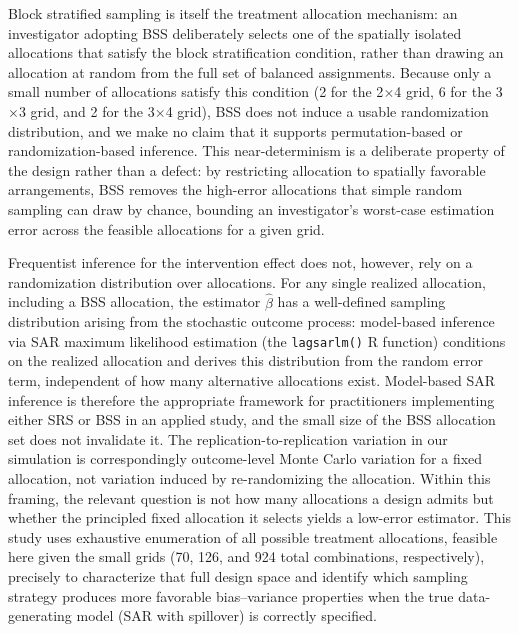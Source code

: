 \documentclass{article}[11pt]
\begin{document}
Block stratified sampling is itself the treatment allocation mechanism: an investigator adopting BSS deliberately selects one of the spatially isolated allocations that satisfy the block stratification condition, rather than drawing an allocation at random from the full set of balanced assignments. Because only a small number of allocations satisfy this condition (2 for the 2$\times$4 grid, 6 for the 3$\times$3 grid, and 2 for the 3$\times$4 grid), BSS does not induce a usable randomization distribution, and we make no claim that it supports permutation-based or randomization-based inference. This near-determinism is a deliberate property of the design rather than a defect: by restricting allocation to spatially favorable arrangements, BSS removes the high-error allocations that simple random sampling can draw by chance, bounding an investigator's worst-case estimation error across the feasible allocations for a given grid.

Frequentist inference for the intervention effect does not, however, rely on a randomization distribution over allocations. For any single realized allocation, including a BSS allocation, the estimator $\hat{\beta}$ has a well-defined sampling distribution arising from the stochastic outcome process: model-based inference via SAR maximum likelihood estimation (the \texttt{lagsarlm()} R function) conditions on the realized allocation and derives this distribution from the random error term, independent of how many alternative allocations exist. Model-based SAR inference is therefore the appropriate framework for practitioners implementing either SRS or BSS in an applied study, and the small size of the BSS allocation set does not invalidate it. The replication-to-replication variation in our simulation is correspondingly outcome-level Monte Carlo variation for a fixed allocation, not variation induced by re-randomizing the allocation. Within this framing, the relevant question is not how many allocations a design admits but whether the principled fixed allocation it selects yields a low-error estimator. This study uses exhaustive enumeration of all possible treatment allocations, feasible here given the small grids (70, 126, and 924 total combinations, respectively), precisely to characterize that full design space and identify which sampling strategy produces more favorable bias--variance properties when the true data-generating model (SAR with spillover) is correctly specified.
\end{document}
